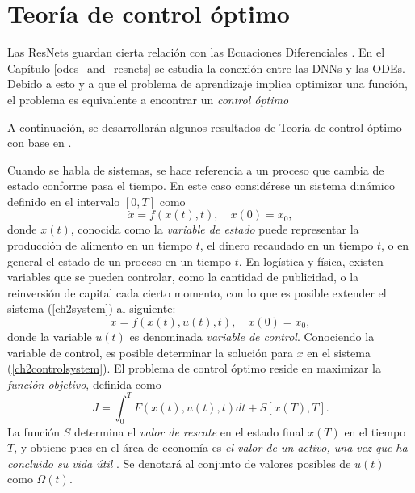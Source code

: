
\chapter{Teoría de control óptimo}
    
Las ResNets guardan cierta relación con las Ecuaciones Diferenciales \cite{stable_resnets}. En el Capítulo \ref{odes_and_resnets} se estudia la conexión entre las DNNs y las ODEs. Debido a esto y a que el problema de aprendizaje implica optimizar una función, el problema es equivalente a encontrar un \textsl{control óptimo}   

A continuación, se desarrollarán algunos resultados de Teoría de control  óptimo con base en \cite{suresh}.  

Cuando se habla de sistemas, se hace referencia a un proceso que cambia de estado conforme pasa el tiempo. En este caso considérese un sistema dinámico definido en el intervalo $[0, T]$ como
\begin{equation}
    \label{ch2system}
    \dot x =f(x(t),t), \quad x(0) = x_0,  
\end{equation}
donde $x(t)$, conocida como la \textsl{variable de estado} puede representar la producción de alimento en un tiempo $t$, el dinero recaudado en un tiempo $t$, o en general el estado de un proceso en un tiempo $t$. En logística y física, existen variables que se pueden controlar, como la cantidad de publicidad, o la reinversión de capital cada cierto momento, con lo que es posible extender el sistema  (\ref{ch2system}) al siguiente:
\begin{equation}
    \label{ch2controlsystem}
    \dot x = f(x(t),u(t),t), \quad x(0) = x_0,
\end{equation}
donde la variable $u(t)$ es denominada \textsl{variable de control}. Conociendo la variable de control, es posible determinar la solución para $x$ en el sistema (\ref{ch2controlsystem}). El problema de control óptimo reside en maximizar la \textsl{función objetivo}, definida como
\begin{equation}
    J = \int_0^T F(x(t), u(t), t)dt + S[x(T), T].
\end{equation}
 La función $S$ determina el \textsl{valor de rescate} en el estado final $x(T)$ en el tiempo $T$, y obtiene pues en el área de economía es \textsl{el valor de un activo, una vez que ha concluido su vida útil} \cite{Engineerin_Economy}. Se denotará al conjunto de valores posibles de $u(t)$ como $\Omega(t)$.

